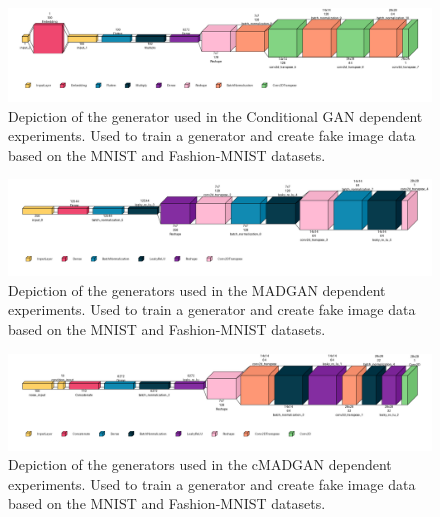 \begin{figure}[htbp]
    \centering
    \vspace{-2em}
    \includegraphics[width=.9\textwidth]{abb/netron_network_archs/define_conditional_mnists_gen.png}
    \caption{Depiction of the generator used in the Conditional GAN dependent experiments. Used to train a generator and create fake image data based on the MNIST and Fashion-MNIST datasets.}
    \label{fig:figure_gen_arch_conditional}
\end{figure}

\begin{figure}[htbp]
    \centering
    \vspace{-2em}
    \includegraphics[width=.9\textwidth]{abb/netron_network_archs/define_madgan_mnists_gen.png}
    \caption{Depiction of the generators used in the MADGAN dependent experiments. Used to train a generator and create fake image data based on the MNIST and Fashion-MNIST datasets.}
    \label{fig:figure_gen_arch_madgan}
\end{figure}

\begin{figure}[htbp]
    \centering
    \vspace{-2em}
    \includegraphics[width=.9\textwidth]{abb/netron_network_archs/define_cmadgan_mnists_gen.png}
    \caption{Depiction of the generators used in the cMADGAN dependent experiments. Used to train a generator and create fake image data based on the MNIST and Fashion-MNIST datasets.}
    \label{fig:figure_gen_arch_cmadgan}
\end{figure}
\newpage


